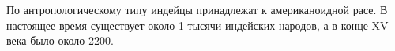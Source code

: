 По антропологическому типу индейцы принадлежат к американоидной 
расе. В настоящее время существует около 1 тысячи индейских 
народов, а в конце XV века было около 2200.
